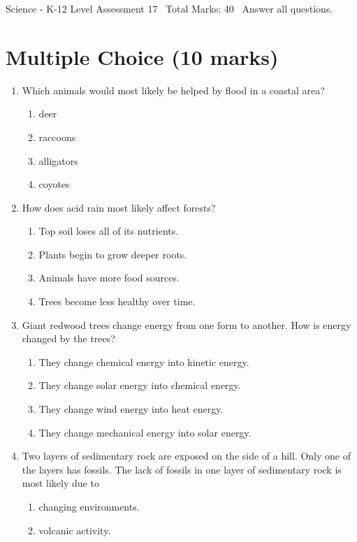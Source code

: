 \documentclass[12pt]{article}
\begin{document}
\begin{center}
Science - K-12 Level Assessment 17 \
Total Marks: 40 \
Answer all questions.
\end{center}

\section*{Multiple Choice (10 marks)}
\begin{enumerate}[label=\arabic*.]
\item Which animals would most likely be helped by flood in a coastal area?
\begin{enumerate}[label=(\alph*)]
    \item deer
    \item raccoons
    \item alligators
    \item coyotes
\end{enumerate}
\item How does acid rain most likely affect forests?
\begin{enumerate}[label=(\alph*)]
    \item Top soil loses all of its nutrients.
    \item Plants begin to grow deeper roots.
    \item Animals have more food sources.
    \item Trees become less healthy over time.
\end{enumerate}
\item Giant redwood trees change energy from one form to another. How is energy changed by the trees?
\begin{enumerate}[label=(\alph*)]
    \item They change chemical energy into kinetic energy.
    \item They change solar energy into chemical energy.
    \item They change wind energy into heat energy.
    \item They change mechanical energy into solar energy.
\end{enumerate}
\item Two layers of sedimentary rock are exposed on the side of a hill. Only one of the layers has fossils. The lack of fossils in one layer of sedimentary rock is most likely due to
\begin{enumerate}[label=(\alph*)]
    \item changing environments.
    \item volcanic activity.

\end{enumerate}
\end{enumerate}
\end{document}

